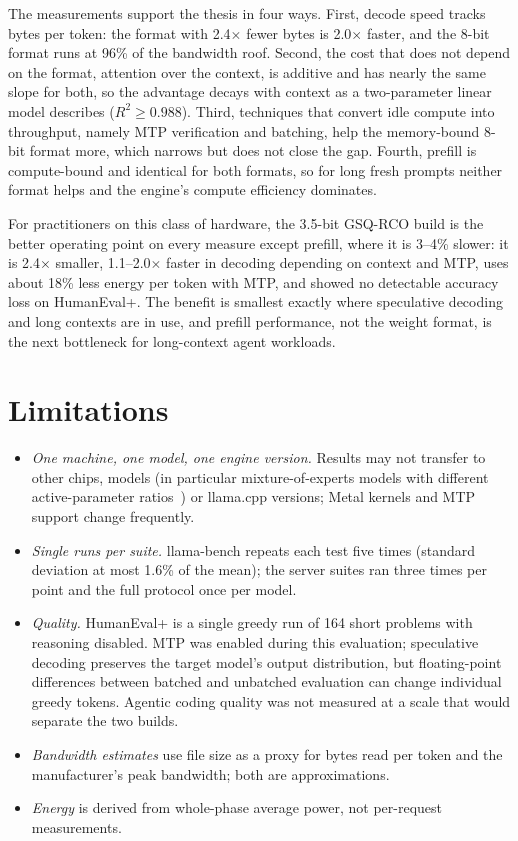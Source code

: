 \documentclass[11pt]{article}
\begin{document}
The measurements support the thesis in four ways. First, decode speed tracks bytes per
token: the format with 2.4$\times$ fewer bytes is 2.0$\times$ faster, and the 8-bit format
runs at 96\% of the bandwidth roof. Second, the cost that does not depend on the format,
attention over the context, is additive and has nearly the same slope for both, so the
advantage decays with context as a two-parameter linear model describes ($R^2 \geq 0.988$). Third,
techniques that convert idle compute into throughput, namely MTP verification and batching,
help the memory-bound 8-bit format more, which narrows but does not close the gap. Fourth,
prefill is compute-bound and identical for both formats, so for long fresh prompts neither
format helps and the engine's compute efficiency dominates.

For practitioners on this class of hardware, the 3.5-bit GSQ-RCO build is the better
operating point on every measure except prefill, where it is 3--4\% slower: it is
2.4$\times$ smaller, 1.1--2.0$\times$ faster in decoding depending on context and MTP, uses about 18\% less energy per token with
MTP, and showed no detectable accuracy loss on HumanEval+. The benefit is smallest exactly
where speculative decoding and long contexts are in use, and prefill performance, not
the weight format, is the next bottleneck for long-context agent workloads.

\section{Limitations}
\label{sec:limits}

\begin{itemize}
  \item \emph{One machine, one model, one engine version.} Results may not transfer to other
        chips, models (in particular mixture-of-experts models with different active-parameter
        ratios~\cite{qiu2026ggufmeta}) or llama.cpp versions; Metal kernels and MTP support
        change frequently.
  \item \emph{Single runs per suite.} llama-bench repeats each test five times (standard
        deviation at most 1.6\% of the mean); the server suites ran
        three times per point and the full protocol once per model.
  \item \emph{Quality.} HumanEval+ is a single greedy run of 164 short problems with reasoning
        disabled. MTP was enabled during this evaluation; speculative decoding preserves the
        target model's output distribution, but floating-point differences between batched and
        unbatched evaluation can change individual greedy tokens. Agentic coding quality was not
        measured at a scale that would separate the two builds.
  \item \emph{Bandwidth estimates} use file size as a proxy for bytes read per token and the
        manufacturer's peak bandwidth; both are approximations.
  \item \emph{Energy} is derived from whole-phase average power, not per-request measurements.
\end{itemize}
\end{document}
